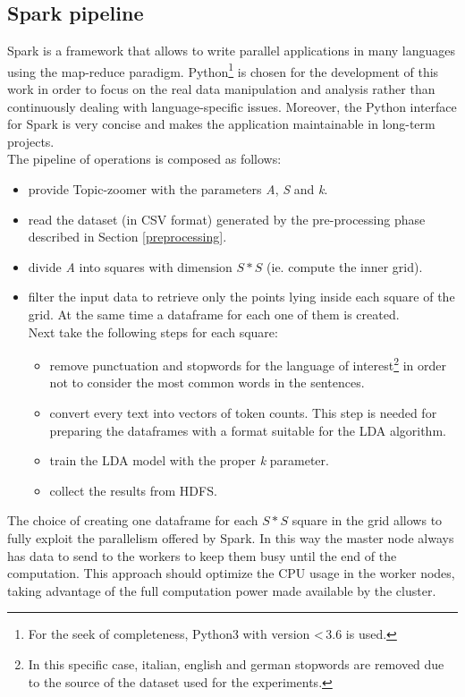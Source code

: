 \documentclass{sig-alternate-05-2015}
\begin{document}
\subsection{Spark pipeline}
Spark is a framework that allows to write parallel applications in many languages using the map-reduce paradigm. Python\footnote{For the seek of completeness, Python3 with version \textless\,3.6 is used.} is chosen for the development of this work in order to focus on the real data manipulation and analysis rather than continuously dealing with language-specific issues. Moreover, the Python interface for Spark is very concise and makes the application maintainable in long-term projects.\\
The pipeline of operations is composed as follows:
\begin{itemize}
    \item provide Topic-zoomer with the parameters \emph{A}, \emph{S} and \emph{k}.
    \item read the dataset (in CSV format) generated by the pre-processing phase described in Section \ref{preprocessing}.
    \item divide \emph{A} into squares with dimension $S*S$ (ie. compute the inner grid).
    \item filter the input data to retrieve only the points lying inside each square of the grid. At the same time a dataframe for each one of them is created.\\
    Next take the following steps for each square:
    \begin{itemize}
        \item remove punctuation and stopwords for the language of interest\footnote{In this specific case, italian, english and german stopwords are removed due to the source of the dataset used for the experiments.} in order not to consider the most common words in the sentences.
        \item convert every text into vectors of token counts. This step is needed for preparing the dataframes with a format suitable for the LDA algorithm.
        \item train the LDA model with the proper \emph{k} parameter.
        \item collect the results from HDFS.
    \end{itemize}
\end{itemize}
The choice of creating one dataframe for each $S*S$ square in the grid allows to fully exploit the parallelism offered by Spark. In this way the master node always has data to send to the workers to keep them busy until the end of the computation. This approach should optimize the CPU usage in the worker nodes, taking advantage of the full computation power made available by the cluster.
\end{document}
